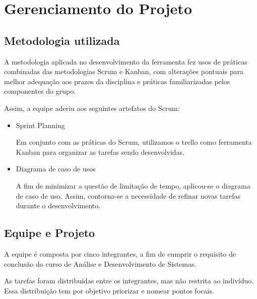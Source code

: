 \chapter{Gerenciamento do Projeto}

	\section{Metodologia utilizada}
		
		A metodologia aplicada no desenvolvimento da ferramenta fez usos de práticas combinadas das metodologias Scrum e Kanban, com alterações pontuais para melhor adequação aos prazos da disciplina e práticas familiarizadas pelos componentes do grupo.

		Assim, a equipe aderiu aos seguintes artefatos do Scrum:

		\begin{itemize}
			\item 
				Sprint Planning

				Em conjunto com as práticas do Scrum, utilizamos o trello como ferramenta Kanban para organizar as tarefas sendo desenvolvidas.

			\item 
				Diagrama de caso de usos
				
				A fim de minimizar a questão de limitação de tempo, aplicou-se o diagrama de caso de uso. Assim, contorna-se a necessidade de refinar novas tarefas durante o desenvolvimento.

		\end{itemize}
		
	\section{Equipe e Projeto}

		A equipe é composta por cinco integrantes, a fim de cumprir o requisito de conclusão do curso de Análise e Desenvolvimento de Sistemas.

		As tarefas foram distribuídas entre os integrantes, mas não restrita ao indivíduo. Essa distribuição tem por objetivo priorizar e nomear pontos focais.
		
